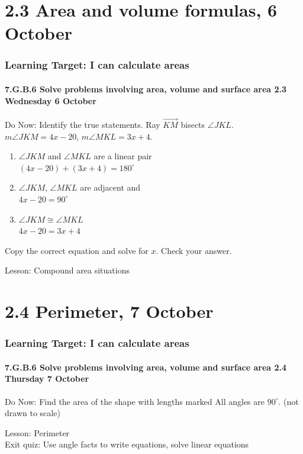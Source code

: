\documentclass{beamer}
\begin{document}
\section{2.3 Area and volume formulas, 6 October}
\frame
{
  \frametitle{Learning Target: I can calculate areas}
  \framesubtitle{7.G.B.6 Solve problems involving area, volume and surface area \hfill \alert{2.3 Wednesday 6 October}}
  \begin{block}{Do Now: Identify the true statements.}
    Ray $\overrightarrow{KM}$ bisects $\angle JKL$. $m\angle JKM = 4x-20$, $m\angle MKL = 3x+4$.
    \begin{multicols}{2}
      \begin{enumerate}
        \item $\angle JKM$ and $\angle MKL$ are a linear pair\\
        $(4x-20) + (3x+4)=180^\circ$
        \item $\angle JKM$, $\angle MKL$ are adjacent and\\
        $4x-20 =90^\circ$
        \item $\angle JKM \cong \angle MKL$\\
        $4x-20 = 3x+4$
    \end{enumerate}
    \begin{center}
    \end{center}
  \end{multicols}
   Copy the correct equation and solve for $x$. Check your answer.
\end{block}
  Lesson: Compound area situations
} 

\section{2.4 Perimeter, 7 October}
\frame
{
  \frametitle{Learning Target: I can calculate areas}
  \framesubtitle{7.G.B.6 Solve problems involving area, volume and surface area \hfill \alert{2.4 Thursday 7 October}}
  \begin{block}{Do Now: Find the area of the shape with lengths marked}
    All angles are $90^\circ$. (not drawn to scale)
    \begin{flushleft}
    \end{flushleft}
\end{block}
  Lesson: Perimeter\\
  Exit quiz: Use angle facts to write equations, solve linear equations
} 
\end{document}
